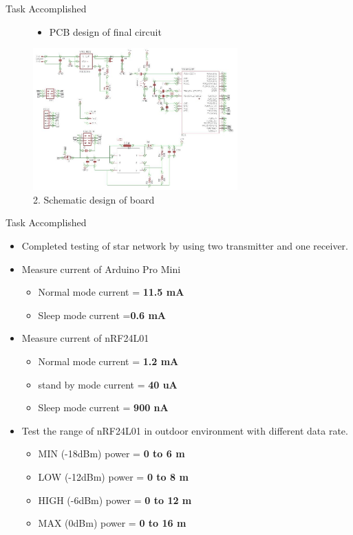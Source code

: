 \documentclass[10pt, a4paper]{beamer}
\begin{document}
\begin{frame}{Task Accomplished}
\begin{figure}
\begin{itemize}
\item PCB design of final circuit
\end{itemize}
\begin{center}
\includegraphics[width=0.7\textwidth]{Capture.JPG}
\caption{2. Schematic design of board}
\end{center}
\end{figure}
\end{frame}


\begin{frame}{Task Accomplished}
	\begin{itemize}
    \item Completed testing of star network by using two transmitter and one receiver.
    \item Measure current of Arduino Pro Mini
    \begin{itemize}
    	\item Normal mode current = \textbf{11.5 mA} 
        \item Sleep mode current =\textbf{0.6 mA}
    \end{itemize}
    \item Measure current of nRF24L01
    \begin{itemize}
    	\item Normal mode current = \textbf{1.2 mA}  
        \item stand by mode current = \textbf{40 uA}
        \item Sleep mode current = \textbf{900 nA}
    \end{itemize}
    \item Test the range of nRF24L01 in outdoor environment with different data rate.
    \begin{itemize}
    	\item  MIN  (-18dBm) power =  \textbf{0 to 6 m}
        \item  LOW  (-12dBm) power =  \textbf{0 to 8 m}
        \item  HIGH (-6dBm)  power = \textbf{0 to 12 m}
        \item  MAX  (0dBm)   power =  \textbf{0 to 16 m}
	\end{itemize}
    \end{itemize}
\end{frame}
\end{document}
